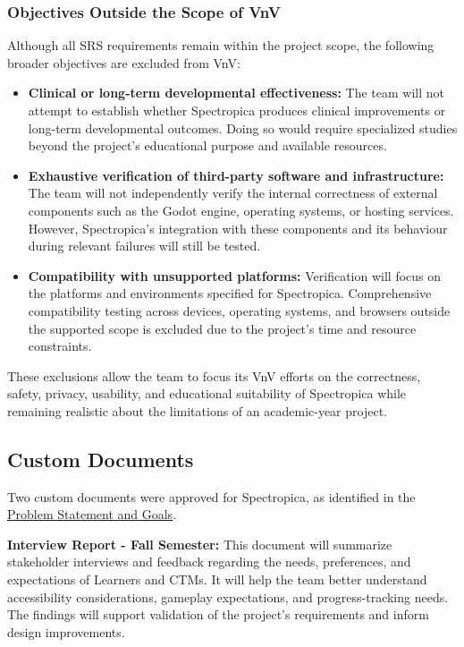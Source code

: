 \documentclass[12pt, titlepage]{article}
\newcounter{validation}
\begin{document}
\subsubsection*{Objectives Outside the Scope of VnV}

Although all SRS requirements remain within the project scope, the following broader objectives are excluded from VnV:

\begin{itemize}

  \item \textbf{Clinical or long-term developmental effectiveness:} The team will not attempt to establish whether Spectropica produces clinical improvements or long-term developmental outcomes. Doing so would require specialized studies beyond the project's educational purpose and available resources.

  \item \textbf{Exhaustive verification of third-party software and infrastructure:} The team will not independently verify the internal correctness of external components such as the Godot engine, operating systems, or hosting services. However, Spectropica's integration with these components and its behaviour during relevant failures will still be tested.

  \item \textbf{Compatibility with unsupported platforms:} Verification will focus on the platforms and environments specified for Spectropica. Comprehensive compatibility testing across devices, operating systems, and browsers outside the supported scope is excluded due to the project's time and resource constraints.

\end{itemize}

These exclusions allow the team to focus its VnV efforts on the correctness, safety, privacy, usability, and educational suitability of Spectropica while remaining realistic about the limitations of an academic-year project.

\subsection{Custom Documents}

Two custom documents were approved for Spectropica, as identified in the
\href{https://github.com/meena-alomran/game-n-grow/blob/main/pdfs/ProblemStatementAndGoals/ProblemStatement.pdf}{Problem
Statement and Goals}.

\textbf{Interview Report - Fall Semester:} This document will summarize
stakeholder interviews and feedback regarding the needs, preferences, and
expectations of Learners and CTMs. It will help the team better understand
accessibility considerations, gameplay expectations, and progress-tracking
needs. The findings will support validation of the project's requirements and
inform design improvements.
\end{document}
